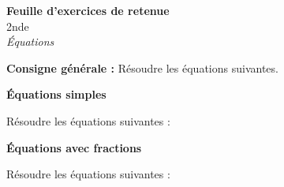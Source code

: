 \documentclass[12pt]{exam}
\begin{document}
\begin{center}
    {\Large \textbf{Feuille d’exercices de retenue}}\\[2mm]
    {\large 2nde}\\[2mm]
    \textit{Équations}
\end{center}

\vspace{0.3cm}

\textbf{Consigne générale :}  
Résoudre les équations suivantes.

\vspace{0.4cm}

\begin{questions}

\question \textbf{Équations simples}

Résoudre les équations suivantes :

\vspace{0.5cm}

\question \textbf{Équations avec fractions}

Résoudre les équations suivantes :


\end{questions}
\end{document}
